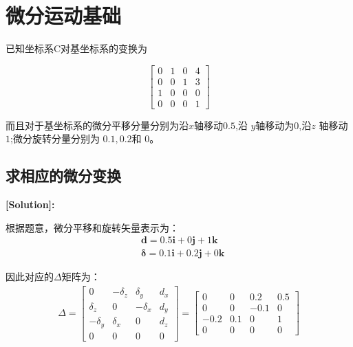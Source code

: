 \documentclass{ctexart}
\begin{document}



\newpage


\newpage
\pagestyle{fancy}
\fancyhf{}
\fancyfoot[C]{\thepage}
\section{微分运动基础}
已知坐标系{C}对基坐标系的变换为

\begin{equation}
	\begin{bmatrix}
		0 & 1 & 0 & 4\\
		0 & 0 & 1 & 3\\
		1 & 0 & 0 & 0\\
		0 & 0 & 0 & 1
	\end{bmatrix}
\end{equation}

而且对于基坐标系的微分平移分量分别为沿$x$轴移动$0.5$,沿 $y $轴移动为$0$,沿$z$ 轴移动$1$;微分旋转分量分别为 $0.1,0.2 $和 $0$。

\subsection{求相应的微分变换}
\textbf{[Solution]:}

根据题意，微分平移和旋转矢量表示为：
\begin{equation}
	\begin{aligned}
		&\mathbf{d} = 0.5\mathbf{i} + 0\mathbf{j} + 1\mathbf{k} \\
		&\mathbf{\delta} = 0.1\mathbf{i} + 0.2\mathbf{j} + 0\mathbf{k}
	\end{aligned}
\end{equation}

因此对应的$\Delta$矩阵为：
\begin{equation}
	\begin{aligned}
		\Delta = \begin{bmatrix}
			0 & -\delta_z & \delta_y & d_x \\
			\delta_z & 0 & -\delta_x & d_y \\
			-\delta_y & \delta_x & 0 & d_z \\
			0 & 0 & 0 & 0
		\end{bmatrix} = \begin{bmatrix}
			0 & 0 & 0.2 & 0.5 \\
			0 & 0 & -0.1 & 0 \\
			-0.2 & 0.1 & 0 & 1 \\
			0 & 0 & 0 & 0
		\end{bmatrix}
	\end{aligned}
\end{equation}
\end{document}
